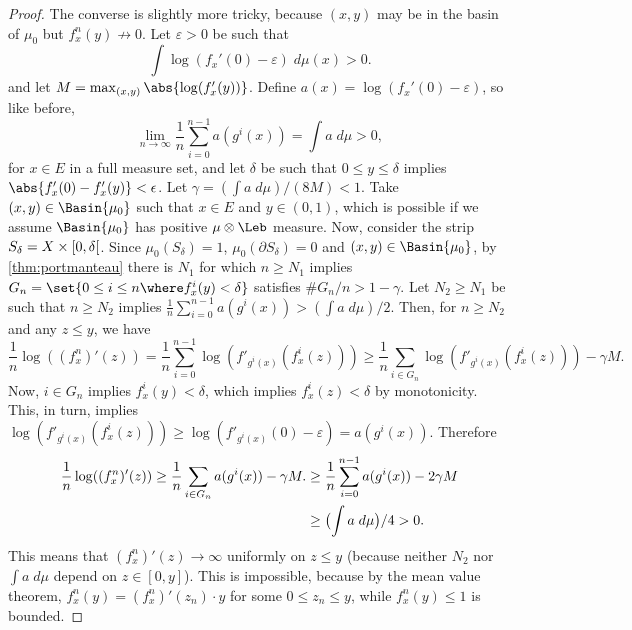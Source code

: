 \documentclass[../main]{subfiles}
\begin{document}
\begin{proof}
  The converse is slightly more tricky, because \((x,y)\) may be in the basin of \(\mu_0\) but \(f_x^n(y)\not\to 0\). Let \(\varepsilon > 0\) be such that
  \begin{equation*}
    \int \log(f_x'(0) - \varepsilon) \;d\mu(x) > 0.
  \end{equation*}
  and let \(M = \max_{(x,y)} \abs{\log (f'_x(y))}\). Define \(a(x) = \log(f_x'(0) - \varepsilon)\), so like before, 
  \begin{equation*}
    \lim_{n \to \infty}\frac{1}{n}\sum_{i = 0}^{n - 1} a(g^i(x)) = 
    \int a \;d\mu > 0,
  \end{equation*}
  for \(x \in E\) in a full measure set, and let \(\delta\) be such that \(0 \le y \le \delta\) implies \(\abs{f_x'(0) - f_x'(y)} < \epsilon\). Let \(\gamma = (\int a \;d\mu)/(8M) < 1\). Take \((x, y) \in \Basin{\mu_0}\) such that \(x \in E\) and \(y \in (0,1)\), which is possible if we assume \(\Basin{\mu_0}\) has positive \(\mu \otimes \Leb\) measure. Now, consider the strip \(S_{\delta} = X \times \interval[open right]{0}{\delta}\). Since \(\mu_0(S_{\delta}) = 1\), \(\mu_0(\partial S_{\delta}) = 0\) and \((x,y) \in \Basin{\mu_0}\), by \cref{thm:portmanteau} there is \(N_1\) for which \(n \ge N_1\) implies \(G_n = \set{0 \le i \le n \where f_x^i(y) < \delta}\) satisfies \(\# G_n / n > 1 - \gamma\). Let \(N_2 \ge N_1\) be such that \(n \ge N_2\) implies \(\frac{1}{n}\sum_{i = 0}^{n - 1} a(g^i(x)) > 
  (\int a \;d\mu)/2\). Then, for \(n \ge N_2\) and any \(z \le y\), we have
  \begin{equation*}
    \frac{1}{n}\log ((f^n_x)'(z))
    = 
    \frac{1}{n}\sum_{i = 0}^{n - 1} \log(f'_{g^i(x)}(f_x^i(z)))
    \ge 
    \frac{1}{n}\sum_{i \in G_n} \log(f'_{g^i(x)}(f_x^i(z))) - \gamma M.
  \end{equation*}
  Now, \(i \in G_n\) implies \(f^i_x(y) < \delta\), which implies \(f^i_x(z) < \delta\) by monotonicity. This, in turn, implies \(\log(f'_{g^i(x)}(f_x^i(z))) \ge \log(f'_{g^i(x)}(0) - \varepsilon) = a(g^i(x))\). Therefore
  \begin{align*}
    \frac{1}{n}\log ((f^n_x)'(z))
    \ge 
    \frac{1}{n}\sum_{i \in G_n} a(g^i(x)) - \gamma M.
    &\ge 
    \frac{1}{n}\sum_{i = 0}^{n - 1} a(g^i(x)) - 2\gamma M\\
    &\ge \rpar[\big]{\int a \;d\mu}/4 > 0.
  \end{align*}
  This means that \((f^n_x)'(z) \to \infty\) uniformly on \(z \le y\) (because neither \(N_2\) nor \(\int a \;d\mu\) depend on \(z \in [0,y]\)). This is impossible, because by the mean value theorem, \(f^n_x(y) = (f^n_x)'(z_n) \cdot y\) for some \(0\le z_n \le y\), while \(f^n_x(y) \le 1\) is bounded.
\end{proof}
\end{document}
